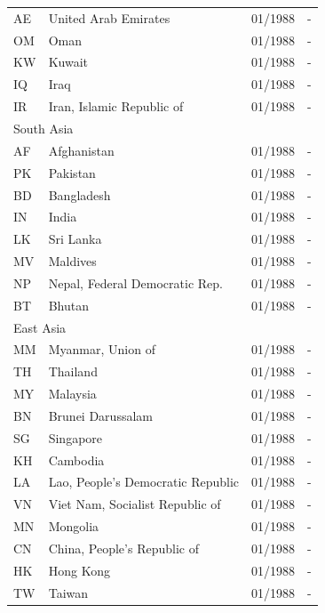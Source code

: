 \begin{scriptsize}
\begin{longtable}{lp{8cm}p{2cm}p{2cm}}
	AE & United Arab Emirates                   & 01/1988 & -  \\
	OM & Oman                                   & 01/1988 & -  \\
	KW & Kuwait                                 & 01/1988 & -  \\
	IQ & Iraq                                   & 01/1988 & -  \\
	IR & Iran, Islamic Republic of              & 01/1988 & -  \\
	\midrule
	\multicolumn{3}{l}{South Asia}  &  \\
	AF & Afghanistan                    & 01/1988 & -  \\
	PK & Pakistan                       & 01/1988 & -  \\
	BD & Bangladesh                     & 01/1988 & -  \\
	IN & India                          & 01/1988 & -  \\
	LK & Sri Lanka                      & 01/1988 & -  \\
	MV & Maldives                       & 01/1988 & -  \\
	NP & Nepal, Federal Democratic Rep. & 01/1988 & -  \\
	BT & Bhutan                         & 01/1988 & -  \\
	\midrule
	\multicolumn{3}{l}{East Asia}  &  \\
	MM & Myanmar, Union of                      & 01/1988 & -  \\
	TH & Thailand                               & 01/1988 & -  \\
	MY & Malaysia                               & 01/1988 & -  \\
	BN & Brunei Darussalam                      & 01/1988 & -  \\
	SG & Singapore                              & 01/1988 & -  \\
	KH & Cambodia                               & 01/1988 & -  \\
	LA & Lao, People's Democratic Republic      & 01/1988 & -  \\
	VN & Viet Nam, Socialist Republic of        & 01/1988 & -  \\
	MN & Mongolia                               & 01/1988 & -  \\
	CN & China, People's Republic of            & 01/1988 & -  \\
	HK & Hong Kong                              & 01/1988 & -  \\
	TW & Taiwan                                 & 01/1988 & -  \\

\end{longtable}
\end{scriptsize}
